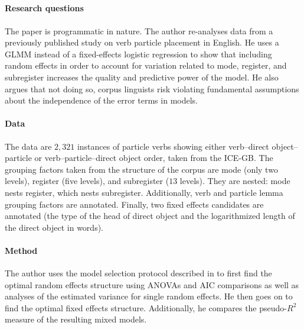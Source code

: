 \documentclass[a4paper,12pt]{article}
\begin{document}
\begin{mdframed}

  \subsection*{\citet{Gries2015}}

  \paragraph{Research questions}
  
  The paper is programmatic in nature.
  The author re-analyses data from a previously published study on verb particle placement in English.
  He uses a GLMM instead of a fixed-effects logistic regression to show that including random effects in order to account for variation related to mode, register, and subregister increases the quality and predictive power of the model.
  He also argues that not doing so, corpus linguists risk violating fundamental assumptions about the independence of the error terms in models.
  
  \paragraph{Data}
  
  The data are $2,321$ instances of particle verbs showing either verb--direct object--particle or verb--particle--direct object order, taken from the ICE-GB.
  The grouping factors taken from the structure of the corpus are mode (only two levels), register (five levels), and subregister ($13$ levels).
  They are nested: mode nests register, which nests subregister.
  Additionally, verb and particle lemma grouping factors are annotated.
  Finally, two fixed effects candidates are annotated (the type of the head of direct object and the logarithmized length of the direct object in words).
  
  \paragraph{Method}
  
  The author uses the model selection protocol described in \citet{ZuurEa2009} to first find the optimal random effects structure using ANOVAs and AIC comparisons as well as analyses of the estimated variance for single random effects.
  He then goes on to find the optimal fixed effects structure.
  Additionally, he compares the pseudo-$R^2$ measure of the resulting mixed models.
  

\end{mdframed}
\end{document}
